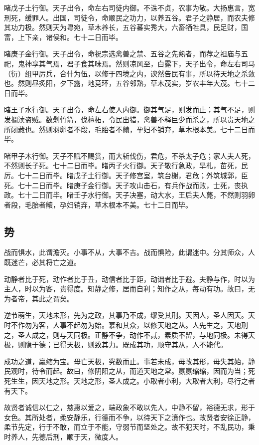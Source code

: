 \documentclass[]{article}
\begin{document}
睹戊子土行御。天子出令，命左右司徒内御。不诛不贞，农事为敬。大扬惠言，宽刑死，缓罪人。出国，司徒令，命顺民之功力，以养五谷。君子之静居，而农夫修其功力极。然则天为粤宛，草木养长，五谷蕃实秀大，六畜牺牲具，民足财，国富，上下亲，诸侯和。七十二日而毕。

睹庚子金行御。天子出令，命祝宗选禽兽之禁、五谷之先熟者，而荐之祖庙与五祀，鬼神享其气焉，君子食其味焉。然则凉风至，白露下，天子出令，命左右司马（衍）组甲厉兵，合什为伍，以修于四境之内，谀然告民有事，所以待天地之杀敛也。然则昼炙阳，夕下露，地竞环，五谷邻熟，草木茂实，岁农丰年大茂。七十二日而毕。

睹王子水行御。天子出令，命左右使人内御。御其气足，则发而止；其气不足，则发撊渎盗贼。数劋竹箭，伐檀柘，令民出猎，禽兽不释巨少而杀之，所以贵天地之所闭藏也。然则羽卵者不段，毛胎者不贕，孕妇不销弃，草木根本美。七十二日而毕。

睹甲子木行御。天子不赋不赐赏，而大斩伐伤，君危，不杀太子危；家人夫人死，不然则长子死。七十二日而毕。睹丙子火行御。天子敬行急政，旱札，苗死，民厉。七十二日而毕。睹戊子土行御。天子修宫室，筑台榭，君危；外筑城郭，臣死。七十二日而毕。睹庚子金行御。天子攻山击石，有兵作战而败，士死，丧执政。七十二日而毕。睹壬子水行御。天子决塞，动大水，王后夫人薨，不然则羽卵者段，毛胎者贕，孕妇销弃，草木根本不美。七十二日而毕。

\hypertarget{header-n572}{%
\subsection{势}\label{header-n572}}

战而惧水，此谓澹灭。小事不从，大事不吉。战而惧险，此谓迷中。分其师众，人既迷芒，必其将亡之道。

动静者比于死，动作者比于丑，动信者比于距，动诎者比于避。夫静与作，时以为主人，时以为客，贵得度。知静之修，居而自利；知作之从，每动有功。故曰，无为者帝，其此之谓矣。

逆节萌生，天地未形，先为之政，其事乃不成，缪受其刑。天因人，圣人因天。天时不作勿为客，人事不起勿为始。慕和其众，以修天地之从。人先生之，天地刑之，圣人成之，则与天同极。正静不争，动作不贰，素质不留，与地同极。未得天极，则隐于德；已得天极，则致其力。既成其功，顺守其从，人不能代。

成功之道，嬴缩为宝。毋亡天极，究数而止。事若未成，毋改其形，毋失其始，静民观时，待令而起。故曰，修阴阳之从，而道天地之常。嬴嬴缩缩，因而为当；死死生生，因天地之形。天地之形，圣人成之。小取者小利，大取者大利，尽行之者有天下。

故贤者诚信以仁之，慈惠以爱之，端政象不敢以先人，中静不留，裕德无求，形于女色。其所处者，柔安静乐，行德而不争，以待天下之濆作也。故贤者安徐正静，柔节先定，行于不敢，而立于不能，守弱节而坚处之。故不犯天时，不乱民功，秉时养人，先德后刑，顺于天，微度人。
\end{document}

